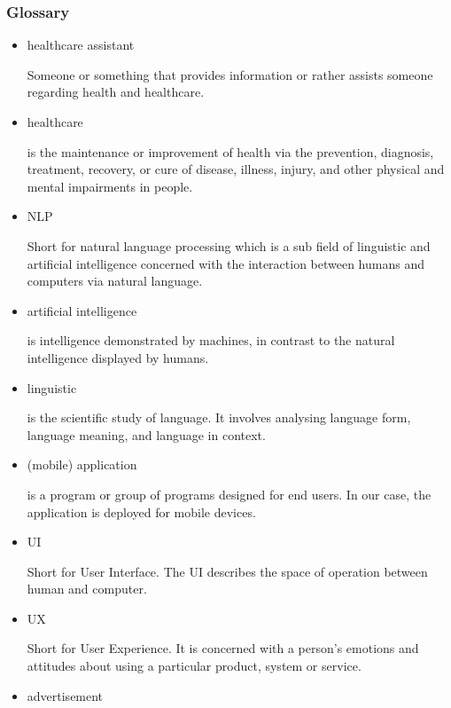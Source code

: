 \documentclass[12pt]{article}
\theoremstyle{definition}
\begin{document}
\subsubsection{Glossary}

\begin{itemize}
    \item healthcare assistant
    
    Someone or something that provides information or rather assists someone regarding health and healthcare. 
    
    \item healthcare
    
    is the maintenance or improvement of health via the prevention, diagnosis, treatment, recovery, or cure of disease, illness, injury, and other physical and mental impairments in people.
    
    \item NLP
    
    Short for natural language processing which is a sub field of linguistic and artificial intelligence concerned with the interaction between humans and computers via natural language.
    
    \item artificial intelligence
    
    is intelligence demonstrated by machines, in contrast to the natural intelligence displayed by humans.
    
    \item linguistic
    
    is the scientific study of language. It involves analysing language form, language meaning, and language in context.
    
    \item (mobile) application
    
    is a program or group of programs designed for end users. In our case, the application is deployed for mobile devices.
    
    \item UI
    
    Short for User Interface. The UI describes the space of operation between human and computer.
    
    \item UX
    
    Short for User Experience. It is concerned with a person's emotions and attitudes about using a particular product, system or service.
    
    \item advertisement
    

\end{itemize}
\end{document}
